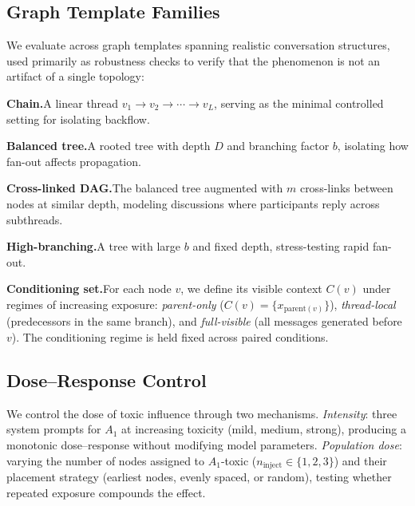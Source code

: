 \subsection{Graph Template Families}
\label{subsec:templates}

We evaluate across graph templates spanning realistic conversation structures, used primarily as robustness checks to verify that the phenomenon is not an artifact of a single topology:

\textbf{Chain.}\quad A linear thread $v_1 \to v_2 \to \cdots \to v_L$, serving as the minimal controlled setting for isolating backflow.

\textbf{Balanced tree.}\quad A rooted tree with depth $D$ and branching factor $b$, isolating how fan-out affects propagation.

\textbf{Cross-linked DAG.}\quad The balanced tree augmented with $m$ cross-links between nodes at similar depth, modeling discussions where participants reply across subthreads.

\textbf{High-branching.}\quad A tree with large $b$ and fixed depth, stress-testing rapid fan-out.

\textbf{Conditioning set.}\quad For each node $v$, we define its visible context $C(v)$ under regimes of increasing exposure: \emph{parent-only} ($C(v) = \{x_{\mathrm{parent}(v)}\}$), \emph{thread-local} (predecessors in the same branch), and \emph{full-visible} (all messages generated before $v$).
The conditioning regime is held fixed across paired conditions.

\subsection{Dose--Response Control}
\label{subsec:dose}

We control the dose of toxic influence through two mechanisms.
\emph{Intensity}: three system prompts for $A_1$ at increasing toxicity (mild, medium, strong), producing a monotonic dose--response without modifying model parameters.
\emph{Population dose}: varying the number of nodes assigned to $A_1$-toxic ($n_{\mathrm{inject}} \in \{1, 2, 3\}$) and their placement strategy (earliest nodes, evenly spaced, or random), testing whether repeated exposure compounds the effect.


